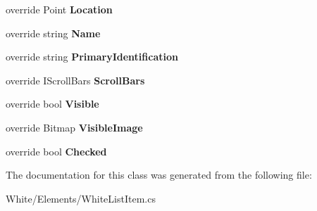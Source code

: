 \begin{DoxyCompactItemize}
\item 
\hypertarget{class_proto_test_1_1_golem_1_1_white_1_1_elements_1_1_white_list_item_abdd171ede38c6bb077a66c0761a0e24d}{override Point {\bfseries Location}}\label{class_proto_test_1_1_golem_1_1_white_1_1_elements_1_1_white_list_item_abdd171ede38c6bb077a66c0761a0e24d}

\item 
\hypertarget{class_proto_test_1_1_golem_1_1_white_1_1_elements_1_1_white_list_item_ac6d0f551708d236e3e67fe2d099d3746}{override string {\bfseries Name}}\label{class_proto_test_1_1_golem_1_1_white_1_1_elements_1_1_white_list_item_ac6d0f551708d236e3e67fe2d099d3746}

\item 
\hypertarget{class_proto_test_1_1_golem_1_1_white_1_1_elements_1_1_white_list_item_a58d8716665a59bea7a83f0bc957c0164}{override string {\bfseries Primary\-Identification}}\label{class_proto_test_1_1_golem_1_1_white_1_1_elements_1_1_white_list_item_a58d8716665a59bea7a83f0bc957c0164}

\item 
\hypertarget{class_proto_test_1_1_golem_1_1_white_1_1_elements_1_1_white_list_item_ac09ccf89108159daf9d1c5f1e99afb86}{override I\-Scroll\-Bars {\bfseries Scroll\-Bars}}\label{class_proto_test_1_1_golem_1_1_white_1_1_elements_1_1_white_list_item_ac09ccf89108159daf9d1c5f1e99afb86}

\item 
\hypertarget{class_proto_test_1_1_golem_1_1_white_1_1_elements_1_1_white_list_item_a104fb22113dcda16c2ab55642867bc48}{override bool {\bfseries Visible}}\label{class_proto_test_1_1_golem_1_1_white_1_1_elements_1_1_white_list_item_a104fb22113dcda16c2ab55642867bc48}

\item 
\hypertarget{class_proto_test_1_1_golem_1_1_white_1_1_elements_1_1_white_list_item_ae9dc55c4b3e35207755ac0a7dbcfc05e}{override Bitmap {\bfseries Visible\-Image}}\label{class_proto_test_1_1_golem_1_1_white_1_1_elements_1_1_white_list_item_ae9dc55c4b3e35207755ac0a7dbcfc05e}

\item 
\hypertarget{class_proto_test_1_1_golem_1_1_white_1_1_elements_1_1_white_list_item_af6718034c255dc2a386bda16842694da}{override bool {\bfseries Checked}}\label{class_proto_test_1_1_golem_1_1_white_1_1_elements_1_1_white_list_item_af6718034c255dc2a386bda16842694da}

\end{DoxyCompactItemize}


The documentation for this class was generated from the following file\-:\begin{DoxyCompactItemize}
\item 
White/\-Elements/White\-List\-Item.\-cs\end{DoxyCompactItemize}
